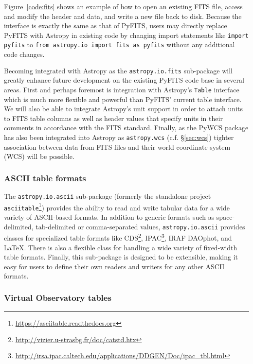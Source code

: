 \documentclass[traditabstract]{aa}
\begin{document}
Figure~\ref{code:fits} shows an example of how to open an existing FITS file,
access and modify the header and data, and write a new file back to disk.
Because the interface is exactly the same as that of PyFITS, users may directly
replace PyFITS with Astropy in existing code by changing import statements like
\texttt{import pyfits} to \texttt{from astropy.io import fits as pyfits}
without any additional code changes.

Becoming integrated with Astropy as the \texttt{astropy.io.fits} sub-package will
greatly enhance future development on the existing PyFITS code base in several
areas. First and perhaps foremost is integration with Astropy's \texttt{Table}
interface which is much more flexible and powerful than PyFITS' current table
interface. We will also be able to integrate Astropy's unit support in order to
attach units to FITS table columns as well as header values that specify units
in their comments in accordance with the FITS standard. Finally, as the PyWCS
package has also been integrated into Astropy as \texttt{astropy.wcs} (c.f.
\S\ref{sec:wcs}) tighter association between data from FITS files and their
world coordinate system (WCS) will be possible.

\subsubsection{ASCII table formats}

\label{sec:ascii}


The \texttt{astropy.io.ascii} sub-package (formerly the standalone project
\texttt{asciitable}\footnote{\url{https://asciitable.readthedocs.org}})
provides the ability to read and write tabular data for a wide variety of
ASCII-based formats. In addition to generic formats such as space-delimited,
tab-delimited or comma-separated values, \texttt{astropy.io.ascii} provides
classes for specialized table formats like
CDS\footnote{\url{http://vizier.u-strasbg.fr/doc/catstd.htx}},
IPAC\footnote{\url{http://irsa.ipac.caltech.edu/applications/DDGEN/Doc/ipac_tbl.html}},
IRAF DAOphot, and LaTeX. There is also a flexible class for handling a wide
variety of fixed-width table formats. Finally, this sub-package is designed to be
extensible, making it easy for users to define their own readers and writers for
any other ASCII formats.

\subsubsection{Virtual Observatory tables}
\end{document}
